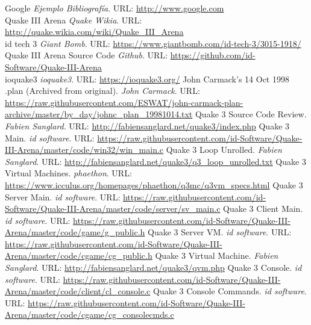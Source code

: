 \documentclass[a4paper,12pt]{report}
\begin{document}
	
	\begin{thebibliography}{9}
		
		Google \emph{Ejemplo Bibliografía}. URL: \url{http://www.google.com}\\
		Quake III Arena \emph{Quake Wikia}. URL: \url{http://quake.wikia.com/wiki/Quake_III_Arena}\\
		 id tech 3 \emph{Giant Bomb}. URL: \url{https://www.giantbomb.com/id-tech-3/3015-1918/}\\
		 Quake III Arena Source Code \emph{Github}. URL: \url{https://github.com/id-Software/Quake-III-Arena}\\
		 ioquake3 \emph{ioquake3}. URL: \url{https://ioquake3.org/}
         John Carmack's 14 Oct 1998 .plan (Archived from original). \emph{John Carmack}. URL: \url{https://raw.githubusercontent.com/ESWAT/john-carmack-plan-archive/master/by_day/johnc_plan_19981014.txt}
		 Quake 3 Source Code Review. \emph{Fabien Sanglard}. URL: \url{http://fabiensanglard.net/quake3/index.php}
		 Quake 3 Main. \emph{id software}. URL: \url{https://raw.githubusercontent.com/id-Software/Quake-III-Arena/master/code/win32/win_main.c}
         Quake 3 Loop Unrolled. \emph{Fabien Sanglard}. URL: \url{http://fabiensanglard.net/quake3/q3_loop_unrolled.txt}
         Quake 3 Virtual Machines. \emph{phaethon}. URL: \url{https://www.icculus.org/homepages/phaethon/q3mc/q3vm_specs.html}
         Quake 3 Server Main. \emph{id software}. URL: \url{https://raw.githubusercontent.com/id-Software/Quake-III-Arena/master/code/server/sv_main.c}
         Quake 3 Client Main. \emph{id software}. URL: \url{https://raw.githubusercontent.com/id-Software/Quake-III-Arena/master/code/game/g_public.h}
         Quake 3 Server VM. \emph{id software}. URL: \url{https://raw.githubusercontent.com/id-Software/Quake-III-Arena/master/code/cgame/cg_public.h}
         Quake 3 Virtual Machine. \emph{Fabien Sanglard}. URL: \url{http://fabiensanglard.net/quake3/qvm.php}
		 Quake 3 Console. \emph{id software}. URL: \url{https://raw.githubusercontent.com/id-Software/Quake-III-Arena/master/code/client/cl_console.c}
		 Quake 3 Console Commands. \emph{id software}. URL: \url{https://raw.githubusercontent.com/id-Software/Quake-III-Arena/master/code/cgame/cg_consolecmds.c}		
	\end{thebibliography}


	
	
\end{document}
